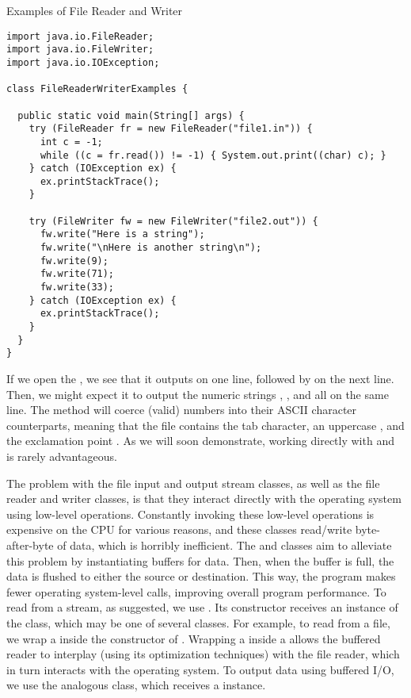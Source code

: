 \begin{cl}[FileReaderWriterExample]{Examples of File Reader and Writer}
\begin{lstlisting}[language=MyJava]
import java.io.FileReader;
import java.io.FileWriter;
import java.io.IOException;

class FileReaderWriterExamples {

  public static void main(String[] args) {
    try (FileReader fr = new FileReader("file1.in")) {
      int c = -1; 
      while ((c = fr.read()) != -1) { System.out.print((char) c); }
    } catch (IOException ex) {
      ex.printStackTrace();
    }

    try (FileWriter fw = new FileWriter("file2.out")) {
      fw.write("Here is a string");
      fw.write("\nHere is another string\n"); 
      fw.write(9);
      fw.write(71);
      fw.write(33);
    } catch (IOException ex) {
      ex.printStackTrace();
    }
  }
}

\end{lstlisting}
\end{cl}

If we open the , we see that it outputs  on one line, followed by  on the next line. Then, we might expect it to output the numeric strings , , and  all on the same line. The  method will coerce (valid) numbers into their ASCII character counterparts, meaning that the file contains the tab character, an uppercase , and the exclamation point . As we will soon demonstrate, working directly with  and  is rarely advantageous. 

The problem with the file input and output stream classes, as well as the file reader and writer classes, is that they interact directly with the operating system using low-level operations. Constantly invoking these low-level operations is expensive on the CPU for various reasons, and these classes read/write byte-after-byte of data, which is horribly inefficient. The  and  classes aim to alleviate this problem by instantiating buffers for data. Then, when the buffer is full, the data is flushed to either the source or destination. This way, the program makes fewer operating system-level calls, improving overall program performance. To read from a stream, as suggested, we use . Its constructor receives an instance of the  class, which may be one of several classes. For example, to read from a file, we wrap a  inside the constructor of . Wrapping a  inside a  allows the buffered reader to interplay (using its optimization techniques) with the file reader, which in turn interacts with the operating system. To output data using buffered I/O, we use the analogous  class, which receives a  instance. 

